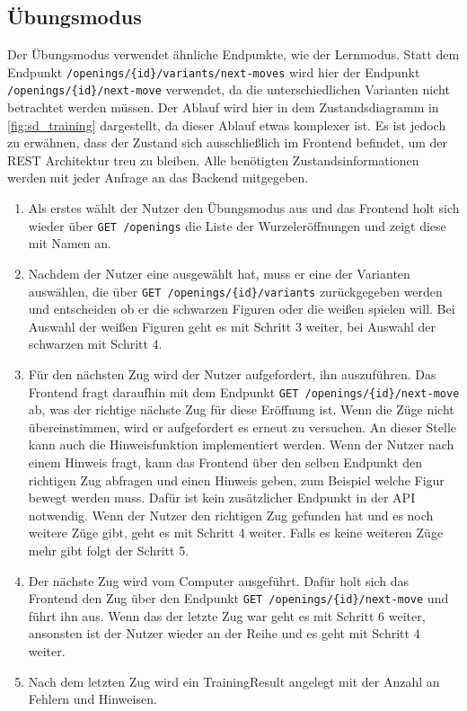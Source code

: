 \subsection{Übungsmodus}
Der Übungsmodus verwendet ähnliche Endpunkte, wie der Lernmodus. Statt dem Endpunkt \lstinline|/openings/{id}/variants/next-moves| wird hier der Endpunkt \lstinline|/openings/{id}/next-move| verwendet, da die unterschiedlichen Varianten nicht betrachtet werden müssen. Der Ablauf wird hier in dem Zustandsdiagramm in \autoref{fig:sd_training} dargestellt, da dieser Ablauf etwas komplexer ist. Es ist jedoch zu erwähnen, dass der Zustand sich ausschließlich im Frontend befindet, um der REST Architektur treu zu bleiben. Alle benötigten Zustandsinformationen werden mit jeder Anfrage an das Backend mitgegeben.

\begin{enumerate}
    \item Als erstes wählt der Nutzer den Übungsmodus aus und das Frontend holt sich wieder über \lstinline{GET /openings} die Liste der Wurzeleröffnungen und zeigt diese mit Namen an.
    \item Nachdem der Nutzer eine ausgewählt hat, muss er eine der Varianten auswählen, die über \lstinline|GET /openings/{id}/variants| zurückgegeben werden und entscheiden ob er die schwarzen Figuren oder die weißen spielen will. Bei Auswahl der weißen Figuren geht es mit Schritt 3 weiter, bei Auswahl der schwarzen mit Schritt 4.
    \item Für den nächsten Zug wird der Nutzer aufgefordert, ihn auszuführen. Das Frontend fragt daraufhin mit dem Endpunkt \lstinline|GET /openings/{id}/next-move| ab, was der richtige nächste Zug für diese Eröffnung ist. Wenn die Züge nicht übereinstimmen, wird er aufgefordert es erneut zu versuchen. An dieser Stelle kann auch die Hinweisfunktion implementiert werden. Wenn der Nutzer nach einem Hinweis fragt, kann das Frontend über den selben Endpunkt den richtigen Zug abfragen und einen Hinweis geben, zum Beispiel welche Figur bewegt werden muss. Dafür ist kein zusätzlicher Endpunkt in der API notwendig. Wenn der Nutzer den richtigen Zug gefunden hat und es noch weitere Züge gibt, geht es mit Schritt 4 weiter. Falls es keine weiteren Züge mehr gibt folgt der Schritt 5.
    \item Der nächste Zug wird vom Computer ausgeführt. Dafür holt sich das Frontend den Zug über den Endpunkt \lstinline|GET /openings/{id}/next-move| und führt ihn aus. Wenn das der letzte Zug war geht es mit Schritt 6 weiter, ansonsten ist der Nutzer wieder an der Reihe und es geht mit Schritt 4 weiter.
    \item Nach dem letzten Zug wird ein TrainingResult angelegt mit der Anzahl an Fehlern und Hinweisen. 
\end{enumerate}

